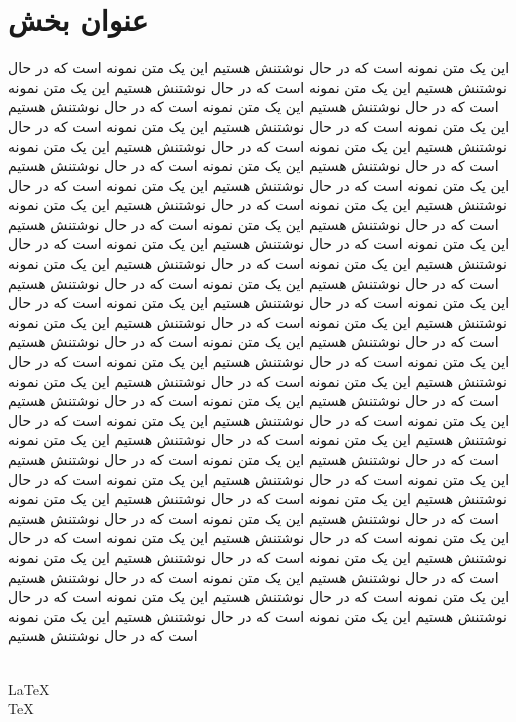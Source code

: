 \documentclass[a4paper,12pt,twoside]{book}
\begin{document}
\chapter{عنوان بخش}
این یک متن نمونه است که در حال نوشتنش هستیم  این یک متن نمونه است که در حال نوشتنش هستیم این یک متن نمونه است که در حال نوشتنش هستیم این یک متن نمونه است که در حال نوشتنش هستیم این یک متن نمونه است که در حال نوشتنش هستیم این یک متن نمونه است که در حال نوشتنش هستیم این یک متن نمونه است که در حال نوشتنش هستیم
این یک متن نمونه است که در حال نوشتنش هستیم  این یک متن نمونه است که در حال نوشتنش هستیم این یک متن نمونه است که در حال نوشتنش هستیم این یک متن نمونه است که در حال نوشتنش هستیم این یک متن نمونه است که در حال نوشتنش هستیم این یک متن نمونه است که در حال نوشتنش هستیم این یک متن نمونه است که در حال نوشتنش هستیم
این یک متن نمونه است که در حال نوشتنش هستیم  این یک متن نمونه است که در حال نوشتنش هستیم این یک متن نمونه است که در حال نوشتنش هستیم این یک متن نمونه است که در حال نوشتنش هستیم این یک متن نمونه است که در حال نوشتنش هستیم این یک متن نمونه است که در حال نوشتنش هستیم این یک متن نمونه است که در حال نوشتنش هستیم
این یک متن نمونه است که در حال نوشتنش هستیم  این یک متن نمونه است که در حال نوشتنش هستیم این یک متن نمونه است که در حال نوشتنش هستیم این یک متن نمونه است که در حال نوشتنش هستیم این یک متن نمونه است که در حال نوشتنش هستیم این یک متن نمونه است که در حال نوشتنش هستیم این یک متن نمونه است که در حال نوشتنش هستیم
این یک متن نمونه است که در حال نوشتنش هستیم  این یک متن نمونه است که در حال نوشتنش هستیم این یک متن نمونه است که در حال نوشتنش هستیم این یک متن نمونه است که در حال نوشتنش هستیم این یک متن نمونه است که در حال نوشتنش هستیم این یک متن نمونه است که در حال نوشتنش هستیم این یک متن نمونه است که در حال نوشتنش هستیم
این یک متن نمونه است که در حال نوشتنش هستیم  این یک متن نمونه است که در حال نوشتنش هستیم این یک متن نمونه است که در حال نوشتنش هستیم این یک متن نمونه است که در حال نوشتنش هستیم این یک متن نمونه است که در حال نوشتنش هستیم این یک متن نمونه است که در حال نوشتنش هستیم این یک متن نمونه است که در حال نوشتنش هستیم
این یک متن نمونه است که در حال نوشتنش هستیم  این یک متن نمونه است که در حال نوشتنش هستیم این یک متن نمونه است که در حال نوشتنش هستیم این یک متن نمونه است که در حال نوشتنش هستیم این یک متن نمونه است که در حال نوشتنش هستیم این یک متن نمونه است که در حال نوشتنش هستیم این یک متن نمونه است که در حال نوشتنش هستیم

{\XeLaTeX}\\
{\LaTeX}\\
{\TeX}\\
{\XeTeX}\\
{\XePersian}
\end{document}
